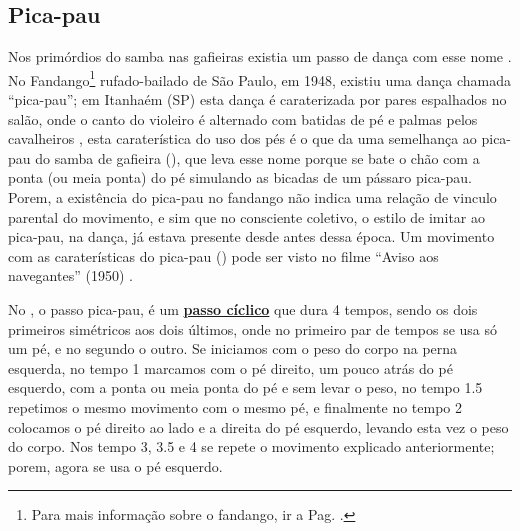 \subsection{Pica-pau} 

Nos primórdios do samba nas gafieiras existia um passo de dança com esse nome \cite[pp. 142]{perna2002samba}.
No Fandango\footnote{Para mais informação sobre o fandango, ir a Pag. \pageref{fig:fandango}.} 
rufado-bailado de São Paulo, em 1948, existiu uma dança chamada ``pica-pau'';
em Itanhaém (SP) esta dança é caraterizada por pares espalhados no salão,
onde o canto do violeiro é alternado com batidas de pé e palmas pelos 
cavalheiros \cite[pp. 607-608]{marcondes1977enciclopediav2} \cite[pp. 49]{fandangoSP},
esta caraterística do uso dos pés é o que da uma semelhança ao pica-pau do samba de gafieira (\AnoLivro),
que leva esse nome porque se bate o chão com a ponta (ou meia ponta) do pé simulando as bicadas de um pássaro pica-pau.
Porem, a existência do pica-pau no fandango não indica uma relação de vinculo parental do movimento,
e sim que no consciente coletivo, o estilo de imitar ao pica-pau, na dança,
já estava presente desde antes dessa época.
Um movimento com as caraterísticas do pica-pau (\AnoLivro) pode ser visto 
no filme ``Aviso aos navegantes'' (1950) \cite[min. 40:35]{AtlantidaDance}.


No \AnoLivro, o passo pica-pau, é um \hyperref[def:PassoCiclico]{\textbf{passo cíclico}} que dura 4 tempos, 
sendo os dois primeiros simétricos aos dois últimos, 
onde no primeiro par de tempos se usa só um pé,
e no segundo o outro.
Se iniciamos com o peso do corpo na perna esquerda, 
no tempo 1 marcamos com o pé direito, um pouco atrás do pé esquerdo, 
com a ponta ou meia ponta do pé e sem levar o peso,
no tempo 1.5 repetimos o mesmo movimento com o mesmo pé, e finalmente
no tempo 2 colocamos o pé direito ao lado e a direita do pé esquerdo, 
levando esta vez o peso do corpo. 
Nos tempo 3, 3.5 e 4 se repete o movimento explicado anteriormente; porem,
agora se usa o pé esquerdo.
  
